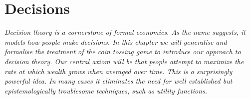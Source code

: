 \newpage


\section{Decisions}
%
%


{\it Decision theory is a cornerstone of formal economics. As the name suggests, it 
models how people make decisions. In this chapter we will generalise and formalise
the treatment of the coin tossing game to introduce our 
approach to decision theory. Our central axiom will be that people attempt to maximize
the rate at which wealth grows when averaged over time. This is a surprisingly powerful idea.
In many cases it eliminates the need for well established but epistemologically troublesome techniques, such as utility functions. 
}
\newpage

